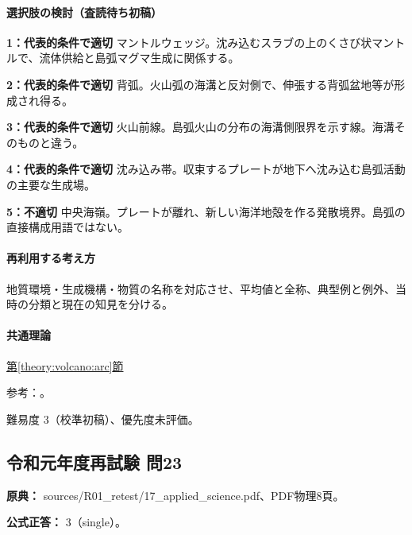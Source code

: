 \paragraph{選択肢の検討（査読待ち初稿）}\mbox{}\par

\noindent\textbf{1：代表的条件で適切} マントルウェッジ。沈み込むスラブの上のくさび状マントルで、流体供給と島弧マグマ生成に関係する。\par

\noindent\textbf{2：代表的条件で適切} 背弧。火山弧の海溝と反対側で、伸張する背弧盆地等が形成され得る。\par

\noindent\textbf{3：代表的条件で適切} 火山前線。島弧火山の分布の海溝側限界を示す線。海溝そのものと違う。\par

\noindent\textbf{4：代表的条件で適切} 沈み込み帯。収束するプレートが地下へ沈み込む島弧活動の主要な生成場。\par

\noindent\textbf{5：不適切} 中央海嶺。プレートが離れ、新しい海洋地殻を作る発散境界。島弧の直接構成用語ではない。\par

\paragraph{再利用する考え方} 地質環境・生成機構・物質の名称を対応させ、平均値と全称、典型例と例外、当時の分類と現在の知見を分ける。

\paragraph{共通理論} \hyperref[theory:volcano:arc]{第\ref*{theory:volcano:arc}節}

\par 参考：\cite{usgs_plate_boundaries}。

\par 難易度 3（校準初稿）、優先度未評価。

\subsection{令和元年度再試験 問23}
\label{q:r01-ret-applied-23}

\noindent\textbf{原典：} sources/R01\_retest/17\_applied\_science.pdf、PDF物理8頁。

\textbf{公式正答：} 3（single）。

